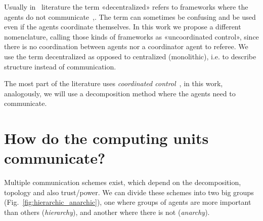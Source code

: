 \documentclass[../main.tex]{subfiles}
\begin{document}
\begin{remark}
  Usually in \dmpc\ literature the term «decentralized» refers to frameworks where the agents do not communicate~\cite[\S 4]{ChristofidesEtAl2013},\cite{NegenbornMaestre2014}.
  The term can sometimes be confusing and be used even if the agents coordinate themselves.
  In this work we propose a different nomenclature, calling those kinds of frameworks as «uncoordinated control», since there is no coordination between agents nor a coordinator agent to referee. We use the term decentralized as opposed to centralized (monolithic), i.e. to describe structure instead of communication.
\end{remark}

The most part of the literature uses \emph{coordinated control}~\cite{NegenbornMaestre2014, ArauzEtAl2021}, in this work, analogously, we will use a decomposition method where the agents need to communicate.


\section{How do the computing units communicate?}

Multiple communication schemes exist, which depend on the decomposition, topology and also trust/power.
We can divide these schemes into two big groups (Fig.~\ref{fig:hierarchic_anarchic}), one where groups of agents are more important than others (\emph{hierarchy}), and another where there is not (\emph{anarchy}).
\end{document}
